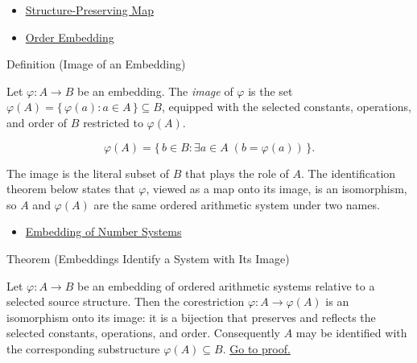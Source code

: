 \begin{dependencies}
\begin{itemize}
  \item \hyperref[def:structure-preserving-map]{Structure-Preserving Map}
  \item \hyperref[def:order-embedding]{Order Embedding}
\end{itemize}
\end{dependencies}
\begin{definitionbox}{Definition (Image of an Embedding)}
\begin{definition}
\label{def:image-of-embedding}
Let $\varphi:A\to B$ be an embedding. The \emph{image} of $\varphi$ is the set $\varphi(A)=\{\,\varphi(a) : a\in A\,\}\subseteq B$, equipped with the selected constants, operations, and order of $B$ restricted to $\varphi(A)$.
\end{definition}
\end{definitionbox}
\begin{remark*}
\[
\varphi(A)=\{\,b\in B:\exists a\in A\;(b=\varphi(a))\,\}.
\]
\end{remark*}
\begin{remark*}[Interpretation]
The image is the literal subset of $B$ that plays the role of $A$. The identification theorem below states that $\varphi$, viewed as a map onto its image, is an isomorphism, so $A$ and $\varphi(A)$ are the same ordered arithmetic system under two names.
\end{remark*}
\begin{dependencies}
\begin{itemize}
  \item \hyperref[def:number-system-embedding]{Embedding of Number Systems}
\end{itemize}
\end{dependencies}
\begin{theorembox}{Theorem (Embeddings Identify a System with Its Image)}
\begin{theorem}
\label{thm:embedding-identifies-with-image}
Let $\varphi:A\to B$ be an embedding of ordered arithmetic systems relative to
a selected source structure. Then the corestriction $\varphi:A\to\varphi(A)$
is an isomorphism onto its image: it is a bijection that preserves and reflects
the selected constants, operations, and order. Consequently $A$ may be
identified with the corresponding substructure $\varphi(A)\subseteq B$.
\hyperref[prf:embedding-identifies-with-image]{Go to proof.}
\end{theorem}
\end{theorembox}
